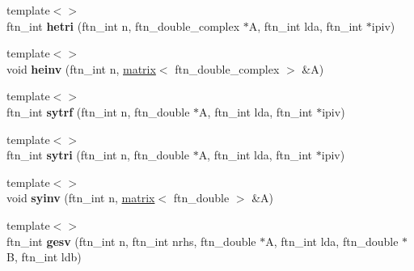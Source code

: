 \begin{DoxyCompactItemize}
\item 
\hypertarget{classsddk_1_1linalg_3_01_c_p_u_01_4_aa60c3336c8c8846435e50f529a29ba58}{}{\footnotesize template$<$$>$ }\\ftn\+\_\+int {\bfseries hetri} (ftn\+\_\+int n, ftn\+\_\+double\+\_\+complex $\ast$A, ftn\+\_\+int lda, ftn\+\_\+int $\ast$ipiv)\label{classsddk_1_1linalg_3_01_c_p_u_01_4_aa60c3336c8c8846435e50f529a29ba58}

\item 
\hypertarget{classsddk_1_1linalg_3_01_c_p_u_01_4_a3999f962617ccc4f25add69d6f8c86ae}{}{\footnotesize template$<$$>$ }\\void {\bfseries heinv} (ftn\+\_\+int n, \hyperlink{classsddk_1_1mdarray}{matrix}$<$ ftn\+\_\+double\+\_\+complex $>$ \&A)\label{classsddk_1_1linalg_3_01_c_p_u_01_4_a3999f962617ccc4f25add69d6f8c86ae}

\item 
\hypertarget{classsddk_1_1linalg_3_01_c_p_u_01_4_a7c9e7f0677bef5e3d4f3bbd097d77003}{}{\footnotesize template$<$$>$ }\\ftn\+\_\+int {\bfseries sytrf} (ftn\+\_\+int n, ftn\+\_\+double $\ast$A, ftn\+\_\+int lda, ftn\+\_\+int $\ast$ipiv)\label{classsddk_1_1linalg_3_01_c_p_u_01_4_a7c9e7f0677bef5e3d4f3bbd097d77003}

\item 
\hypertarget{classsddk_1_1linalg_3_01_c_p_u_01_4_a6769d3a2c12d8c3323252a47c997b505}{}{\footnotesize template$<$$>$ }\\ftn\+\_\+int {\bfseries sytri} (ftn\+\_\+int n, ftn\+\_\+double $\ast$A, ftn\+\_\+int lda, ftn\+\_\+int $\ast$ipiv)\label{classsddk_1_1linalg_3_01_c_p_u_01_4_a6769d3a2c12d8c3323252a47c997b505}

\item 
\hypertarget{classsddk_1_1linalg_3_01_c_p_u_01_4_a8e6ae56e9f9c3b5d575bdab152c11703}{}{\footnotesize template$<$$>$ }\\void {\bfseries syinv} (ftn\+\_\+int n, \hyperlink{classsddk_1_1mdarray}{matrix}$<$ ftn\+\_\+double $>$ \&A)\label{classsddk_1_1linalg_3_01_c_p_u_01_4_a8e6ae56e9f9c3b5d575bdab152c11703}

\item 
\hypertarget{classsddk_1_1linalg_3_01_c_p_u_01_4_a2d891deef65c792ccffdf106eb026dd9}{}{\footnotesize template$<$$>$ }\\ftn\+\_\+int {\bfseries gesv} (ftn\+\_\+int n, ftn\+\_\+int nrhs, ftn\+\_\+double $\ast$A, ftn\+\_\+int lda, ftn\+\_\+double $\ast$B, ftn\+\_\+int ldb)\label{classsddk_1_1linalg_3_01_c_p_u_01_4_a2d891deef65c792ccffdf106eb026dd9}


\end{DoxyCompactItemize}
